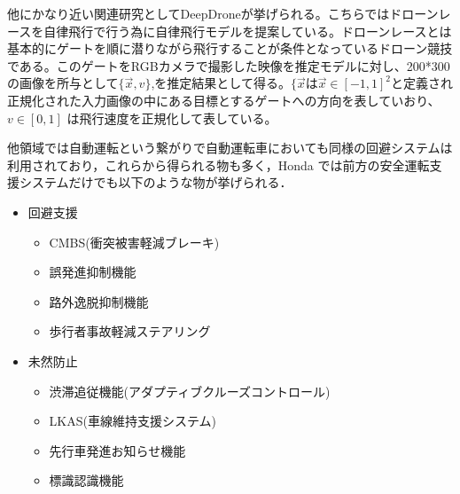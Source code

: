 他にかなり近い関連研究としてDeepDrone\cite{DeepDrone}が挙げられる。こちらではドローンレースを自律飛行で行う為に自律飛行モデルを提案している。ドローンレースとは基本的にゲートを順に潜りながら飛行することが条件となっているドローン競技である。このゲートをRGBカメラで撮影した映像を推定モデルに対し、200*300の画像を所与として$\lbrace \vec{x}, v \rbrace$,を推定結果として得る。$\lbrace \vec{x}$は$\vec{x} \in [-1,1]^2$と定義され正規化された入力画像の中にある目標とするゲートへの方向を表していおり、 $v \in [0,1]$ は飛行速度を正規化して表している。


他領域では自動運転という繋がりで自動運転車においても同様の回避システムは利用されており，これらから得られる物も多く，Honda\cite{Honda} では前方の安全運転支援システムだけでも以下のような物が挙げられる．

\begin{itemize}
\item 回避支援
  \begin{itemize}
    \item CMBS(衝突被害軽減ブレーキ)
    \item 誤発進抑制機能
    \item 路外逸脱抑制機能
    \item 歩行者事故軽減ステアリング
  \end{itemize}
\item 未然防止
  \begin{itemize}
    \item 渋滞追従機能(アダプティブクルーズコントロール)
    \item LKAS(車線維持支援システム)
    \item 先行車発進お知らせ機能
    \item 標識認識機能
  \end{itemize}
\end{itemize}


